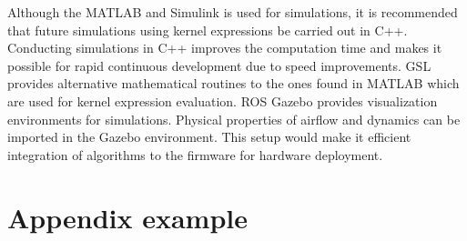 \documentclass[letterpaper%
, twoside%
, 12pt%
,memoire%
, english%
,creativecommons,hyperref%
]{thETS}
\theoremstyle{newThmStyle}
\begin{document}
\begin{conclusion}
Although the MATLAB and Simulink is used for simulations, it is recommended that future simulations using kernel expressions be carried out in C++. Conducting simulations in C++ improves the computation time and makes it possible for rapid continuous development due to speed improvements. GSL provides alternative mathematical routines to the ones found in MATLAB which are used for kernel expression evaluation. ROS Gazebo provides visualization environments for simulations. Physical properties of airflow and dynamics can be imported in the Gazebo environment. This setup would make it efficient integration of algorithms to the firmware for hardware deployment. 

\end{conclusion}



\appendix

\multiannexe

% 

\chapter{Appendix example}
\end{document}
